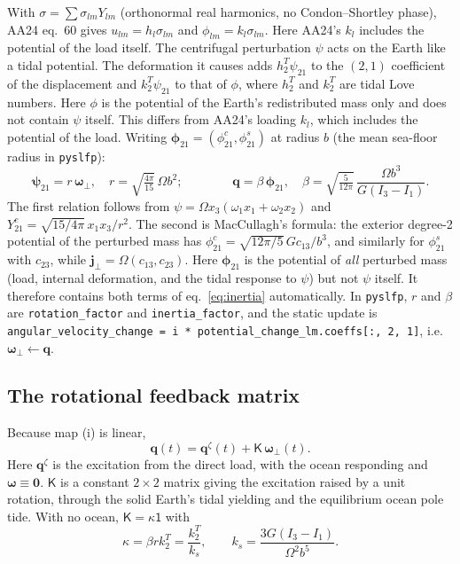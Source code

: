 \documentclass[11pt,a4paper]{article}
\newcommand{\bw}{\bm{\omega}}
\newcommand{\bj}{\mathbf{j}}
\newcommand{\bq}{\mathbf{q}}
\newcommand{\Id}{\mathsf{1}}
\newcommand{\K}{\mathsf{K}}
\begin{document}
With $\sigma=\sum\sigma_{lm}Y_{lm}$ (orthonormal real harmonics, no Condon--Shortley phase), AA24
eq.~60 gives $u_{lm}=h_l\sigma_{lm}$ and $\phi_{lm}=k_l\sigma_{lm}$. Here AA24's $k_l$ includes the
potential of the load itself. The centrifugal perturbation $\psi$ acts on the Earth like a tidal potential. The deformation it
causes adds $h^T_2\psi_{21}$ to the $(2,1)$ coefficient of the displacement and $k^T_2\psi_{21}$ to that
of $\phi$, where $h^T_2$ and $k^T_2$ are tidal Love numbers. Here $\phi$ is the potential of the Earth's
redistributed mass only and does not contain $\psi$ itself. This differs from AA24's loading $k_l$,
which includes the potential of the load. Writing
$\bm\phi_{21}=(\phi^c_{21},\phi^s_{21})$ at radius $b$ (the mean sea-floor radius in
\texttt{pyslfp}):
\begin{equation}
  \bm\psi_{21}=r\,\bw_\perp,\quad r=\sqrt{\tfrac{4\pi}{15}}\,\Omega b^2;\qquad\qquad
  \bq=\beta\,\bm\phi_{21},\quad
  \beta=\sqrt{\tfrac{5}{12\pi}}\,\frac{\Omega b^3}{G(I_3-I_1)} .
  \label{eq:rbeta}
\end{equation}
The first relation follows from $\psi=\Omega x_3(\omega_1x_1+\omega_2x_2)$ and
$Y^c_{21}=\sqrt{15/4\pi}\,x_1x_3/r^2$. The second is MacCullagh's formula: the exterior degree-2
potential of the perturbed mass has $\phi^c_{21}=\sqrt{12\pi/5}\,Gc_{13}/b^3$, and similarly for
$\phi^s_{21}$ with $c_{23}$, while $\bj_\perp=\Omega(c_{13},c_{23})$. Here $\bm\phi_{21}$ is the potential of
\emph{all} perturbed mass (load, internal deformation, and the tidal response to $\psi$) but not
$\psi$ itself. It therefore contains both terms of eq.~\eqref{eq:inertia} automatically. In
\texttt{pyslfp}, $r$ and $\beta$ are \texttt{rotation\_factor} and \texttt{inertia\_factor}, and the static update is
\texttt{angular\_velocity\_change = i * potential\_change\_lm.coeffs[:, 2, 1]}, i.e.\ $\bw_\perp\leftarrow\bq$.

\subsection{The rotational feedback matrix}
\label{sec:K}

Because map (i) is linear,
\begin{equation}
  \bq(t)=\bq^\zeta(t)+\K\,\bw_\perp(t).
  \label{eq:K}
\end{equation}
Here $\bq^\zeta$ is the excitation from the direct load, with the ocean responding and $\bw\equiv\mathbf{0}$.
$\K$ is a constant $2\times2$ matrix giving the excitation raised by a unit rotation, through the
solid Earth's tidal yielding and the equilibrium ocean pole tide. With no ocean,
$\K=\kappa\Id$ with
\begin{equation}
  \kappa=\beta r k^T_2=\frac{k_2^T}{k_s},\qquad k_s=\frac{3G(I_3-I_1)}{\Omega^2b^5}.
  \label{eq:kappa}
\end{equation}
\end{document}
